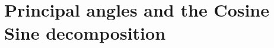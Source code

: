 \documentclass[twoside,11pt]{book}
\numberwithin{theorem}{chapter}
\numberwithin{definition}{chapter}
\numberwithin{proposition}{chapter}
\numberwithin{corollary}{chapter}
\numberwithin{example}{chapter}
\numberwithin{lemma}{chapter}
\begin{document}






\section{Principal angles and the Cosine Sine decomposition}
\label{app:principal_angles}


\end{document}

